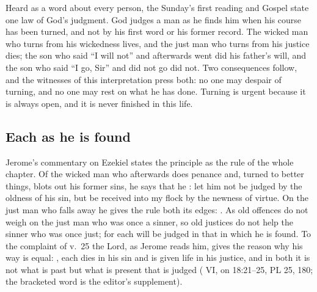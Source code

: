 \label{sec:afterward-he-repented}

Heard as a word about every person, the Sunday's first reading and Gospel state
one law of God's judgment. God judges a man as he finds him when his course
has been turned, and not by his first word or his former record. The wicked
man who turns from his wickedness lives, and the just man who turns from his
justice dies; the son who said ``I will not'' and afterwards went did his
father's will, and the son who said ``I go, Sir'' and did not go did not. Two
consequences follow, and the witnesses of this interpretation press both: no
one may despair of turning, and no one may rest on what he has done. Turning
is urgent because it is always open, and it is never finished in this life.

\subsection{Each as he is found}

Jerome's commentary on Ezekiel states the principle as the rule of the whole
chapter. Of the wicked man who afterwards does penance and, turned to better
things, blots out his former sins, he says that he : let
him not be judged by the oldness of his sin, but be received into my flock by
the newness of virtue. On the just man who falls away he gives the rule both
its edges: . As old
offences do not weigh on the just man who was once a sinner, so old justices do
not help the sinner who was once just; for each will be judged in that in which
he is found. To the complaint of v.~25 the Lord, as Jerome reads him, gives the
reason why his way is equal: , each dies in his sin and is given life in his justice, and in
both it is not what is past but what is present that is judged ( VI, on 18:21--25, PL 25, 180; the bracketed word is the editor's
supplement).

